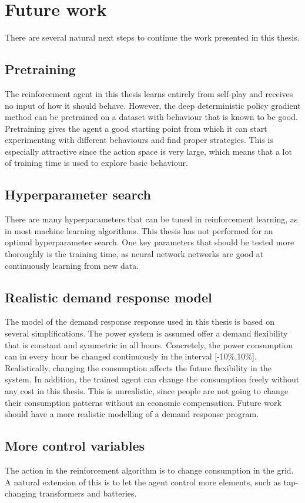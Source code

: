 \documentclass[class=book, crop=false, 11pt]{standalone}
\begin{document}
\section{Future work}
There are several natural next steps to continue the work presented in this thesis. 

\subsection*{Pretraining}
The reinforcement agent in this thesis learns entirely from self-play and receives no input of how it should behave. However, the deep deterministic policy gradient method can be pretrained on a dataset with behaviour that is known to be good. Pretraining gives the agent a good starting point from which it can start experimenting with different behaviours and find proper strategies. This is especially attractive since the action space is very large, which means that a lot of training time is used to explore basic behaviour.

\subsection*{Hyperparameter search}
There are many hyperparameters that can be tuned in reinforcement learning, as in most machine learning algorithms. This thesis has not performed for an optimal hyperparameter search. One key parameters that should be tested more thoroughly is the training time, as neural network networks are good at continuously learning from new data.     
\subsection*{Realistic demand response model}
The model of the demand response response used in this thesis is based on several simplifications. The power system is assumed offer a demand flexibility that is constant and symmetric in all hours. Concretely, the power consumption can in every hour be changed continuously in the interval [-10\%,10\%]. Realistically, changing the consumption affects the future flexibility in the system. In addition, the trained agent can change the consumption freely without any cost in this thesis. This is unrealistic, since people are not going to change their consumption patterns without an economic compensation. Future work should have a more realistic modelling of a demand response program.
\subsection*{More control variables}
The action in the reinforcement algorithm is to change consumption in the grid. A natural extension of this is to let the agent control more elements, such as tap-changing transformers and batteries.
\end{document}
